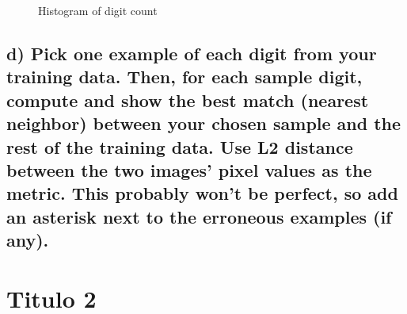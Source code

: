 \documentclass[11pt,letterpaper]{article}
\begin{document}
\begin{figure}[ht!]
\centering
{}
\caption{Histogram of digit count}\label{Digit Count}
\end{figure}

\subsection{d) Pick one example of each digit from your training data. Then, for each sample digit, compute and show the best match (nearest neighbor) between your chosen sample and the rest of the training data. Use L2 distance between the two images’ pixel values as the metric. This probably won’t be perfect, so add an asterisk next to the erroneous examples (if any).}

\newpage
\section{Titulo 2}

\end{document}

